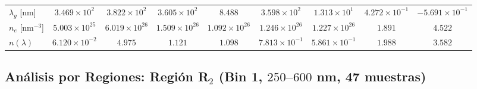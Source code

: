 \documentclass{article}
\begin{document}
\begin{table}[htbp]
\begin{tabular}{@{}lcccccccc@{}}
$\lambda_{g}$ [nm] & $3.469 \times 10^2$ & $3.822 \times 10^2$ & $3.605 \times 10^2$ & $8.488$ & $3.598 \times 10^2$ & $1.313 \times 10^1$ & $4.272 \times 10^{-1}$ & $-5.691 \times 10^{-1}$ \\
$n_{e}$ [nm$^{-3}$] & $5.003 \times 10^{25}$ & $6.019 \times 10^{26}$ & $1.509 \times 10^{26}$ & $1.092 \times 10^{26}$ & $1.246 \times 10^{26}$ & $1.227 \times 10^{26}$ & $1.891$ & $4.522$ \\
$n(\lambda)$ & $6.120 \times 10^{-2}$ & $4.975$ & $1.121$ & $1.098$ & $7.813 \times 10^{-1}$ & $5.861 \times 10^{-1}$ & $1.988$ & $3.582$ \\
\bottomrule
\end{tabular}
\end{table}

\subsection{An\'alisis por Regiones: Regi\'on R$_2$ (Bin 1, $250$--$600$ nm, 47 muestras)}
\end{document}
